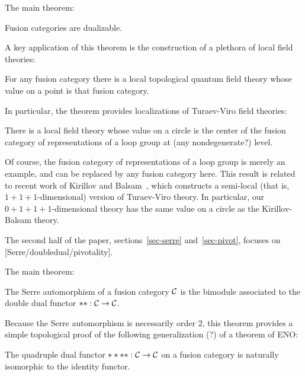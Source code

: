 \documentclass{amsart}
\begin{document}
The main theorem:
\begin{theorem}
Fusion categories are dualizable.
\end{theorem}

A key application of this theorem is the construction of a plethora of local field theories:
\begin{corollary}
For any fusion category there is a local topological quantum field theory whose value on a point is that fusion category.
\end{corollary}

In particular, the theorem provides localizations of Turaev-Viro field theories:
\begin{corollary}
There is a local field theory whose value on a circle is the center of the fusion category of representations of a loop group at (any nondegenerate?) level.
\end{corollary}
Of course, the fusion category of representations of a loop group is merely an example, and can be replaced by any fusion category here.  This result is related to recent work of Kirillov and Balsam~\cite{kirillovbalsam}, which constructs a semi-local (that is, $1+1+1$-dimensional) version of Turaev-Viro theory.  In particular, our $0+1+1+1$-dimensional theory has the same value on a circle as the Kirillov-Balsam theory.  


The second half of the paper, sections~\ref{sec-serre} and~\ref{sec-pivot}, focuses on [Serre/doubledual/pivotality].

The main theorem:
\begin{theorem}
The Serre automorphism of a fusion category $\mathcal C$ is the bimodule associated to the double dual functor $**: \mathcal C \rightarrow \mathcal C$.
\end{theorem}

Because the Serre automorphism is necessarily order 2, this theorem provides a simple topological proof of the following generalization (?) of a theorem of ENO:
\begin{corollary}
The quadruple dual functor $****: \mathcal C \rightarrow \mathcal C$ on a fusion category is naturally isomorphic to the identity functor.
\end{corollary}
\end{document}
